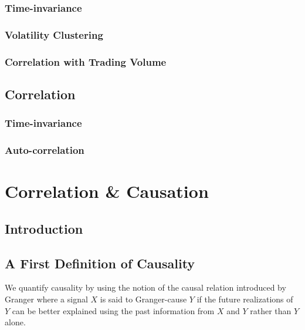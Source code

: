 \documentclass[]{book}
\theoremstyle{definition}
\theoremstyle{definition}
\theoremstyle{definition}
\theoremstyle{remark}
\begin{document}
\subsection{Time-invariance}\label{time-invariance}

\subsection{Volatility Clustering}\label{volatility-clustering}

\subsection{Correlation with Trading
Volume}\label{correlation-with-trading-volume}

\section{Correlation}\label{correlation}

\subsection{Time-invariance}\label{time-invariance-1}

\subsection{Auto-correlation}\label{auto-correlation}

\chapter{Correlation \& Causation}\label{correlation-causation}

\section{Introduction}\label{introduction-1}

\section{A First Definition of
Causality}\label{a-first-definition-of-causality}

We quantify causality by using the notion of the causal relation
introduced by Granger \citep{Wiener56, granger:econ} where a signal
\(X\) is said to Granger-cause \(Y\) if the future realizations of \(Y\)
can be better explained using the past information from \(X\) and \(Y\)
rather than \(Y\) alone.
\end{document}
